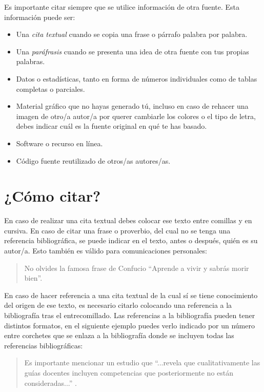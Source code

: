 Es importante citar siempre que se utilice información de otra fuente. Esta información puede ser:

\begin{itemize}
    \item Una {\em cita textual} cuando se copia una frase o párrafo palabra por palabra.
    \item Una {\em paráfrasis} cuando se presenta una idea de otra fuente con tus propias palabras.
    \item Datos o estadísticas, tanto en forma de números individuales como de tablas completas o parciales.
    \item Material gráfico que no hayas generado tú, incluso en caso de rehacer una imagen de otro/a autor/a por querer cambiarle los colores o el tipo de letra, debes indicar cuál es la fuente original en qué te has basado. 
    \item Software o recurso en línea.
    \item Código fuente reutilizado de otros/as autores/as.
\end{itemize}

\section{¿Cómo citar?}

En caso de realizar una cita textual debes colocar ese texto entre comillas y en cursiva. En caso de citar una frase o proverbio, del cual no se tenga una referencia bibliográfica, se puede indicar en el texto, antes o después, quién es su autor/a. Esto también es válido para comunicaciones personales:

\begin{quote}
\begin{it}
    No olvides la famosa frase de Confucio ``Aprende a vivir y sabrás morir bien''.
\end{it}
\end{quote}

En caso de hacer referencia a una cita textual de la cual sí se tiene conocimiento del origen de ese texto, es necesario citarlo colocando una referencia a la bibliografía tras el entrecomillado. Las referencias a la bibliografía pueden tener distintos formatos, en el siguiente ejemplo puedes verlo indicado por un número entre corchetes que se enlaza a la bibliografía donde se incluyen todas las referencias bibliográficas:

\begin{quote}
\begin{it}
     Es importante mencionar un estudio que ``...revela que cualitativamente las guías docentes incluyen competencias que posteriormente no están consideradas...'' \cite{fernandez2023evaluacion}.
\end{it}
\end{quote}

